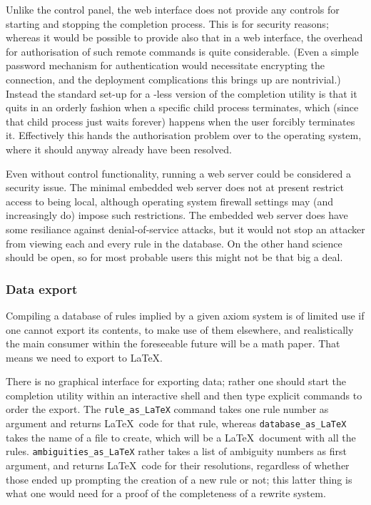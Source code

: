 \documentclass{article}
\theoremstyle{definition}
\begin{document}
Unlike the  control panel, the web interface does not 
provide any controls for starting and stopping the completion 
process. This is for security reasons; whereas it would be possible 
to provide also that in a web interface, the overhead for 
authorisation of such remote commands is quite considerable. (Even a 
simple password mechanism for authentication would necessitate 
encrypting the connection, and the deployment complications this 
brings up are nontrivial.) Instead the standard set-up for a 
-less version of the completion utility is that it quits 
in an orderly fashion when a specific child process terminates, which 
(since that child process just waits forever) happens when the user 
forcibly terminates it. Effectively this hands the authorisation 
problem over to the operating system, where it should anyway already 
have been resolved.

Even without control functionality, running a web server could be 
considered a security issue. The minimal embedded web server does not 
at present restrict access to being local, although operating system 
firewall settings may (and increasingly do) impose such restrictions. 
The embedded web server does have some resiliance against 
denial-of-service attacks, but it would not stop an attacker from 
viewing each and every rule in the database. On the other hand 
science should be open, so for most probable users this might not be 
that big a deal.




\subsubsection{Data export}

Compiling a database of rules implied by a given axiom system is of 
limited use if one cannot export its contents, to make use of them 
elsewhere, and realistically the main consumer within the foreseeable 
future will be a math paper. That means we need to export to \LaTeX.

There is no graphical interface for exporting data; rather one should 
start the completion utility within an interactive shell and then 
type explicit commands to order the export. The \verb|rule_as_LaTeX| 
command takes one rule number as argument and returns \LaTeX\ code 
for that rule, whereas \verb|database_as_LaTeX| takes the name of a 
file to create, which will be a \LaTeX\ document with all the rules. 
\verb|ambiguities_as_LaTeX| rather takes a list of ambiguity numbers 
as first argument, and returns \LaTeX\ code for their resolutions, 
regardless of whether those ended up prompting the creation of a new 
rule or not; this latter thing is what one would need for a proof of 
the completeness of a rewrite system.
\end{document}
